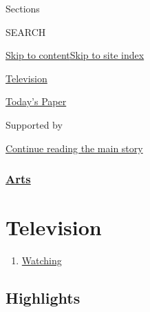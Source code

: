 Sections

SEARCH

\protect\hyperlink{site-content}{Skip to
content}\protect\hyperlink{site-index}{Skip to site index}

\href{https://www.nytimes.com/section/arts/television}{Television}

\href{https://myaccount.nytimes.com/auth/login?response_type=cookie\&client_id=vi}{}

\href{https://www.nytimes.com/section/todayspaper}{Today's Paper}

Supported by

\protect\hyperlink{after-sponsor}{Continue reading the main story}

\hypertarget{arts}{%
\subsubsection{\texorpdfstring{\href{/section/arts}{Arts}}{Arts}}\label{arts}}

\hypertarget{television}{%
\section{Television}\label{television}}

\begin{enumerate}
\def\labelenumi{\arabic{enumi}.}
\tightlist
\item
  \href{/watching}{Watching}
\end{enumerate}

\hypertarget{highlights}{%
\subsection{Highlights}\label{highlights}}


